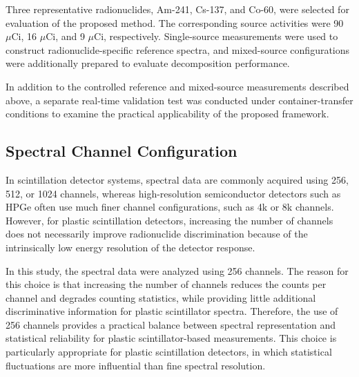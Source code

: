 \documentclass[fleqn, 10pt]{wlscirep}
\begin{document}


Three representative radionuclides, Am-241, Cs-137, and Co-60, were selected for evaluation of the proposed method. The corresponding source activities were 90 $\mu\text{Ci}$, 16 $\mu\text{Ci}$, and 9 $\mu\text{Ci}$, respectively. Single-source measurements were used to construct radionuclide-specific reference spectra, and mixed-source configurations were additionally prepared to evaluate decomposition performance.

In addition to the controlled reference and mixed-source measurements described above, a separate real-time validation test was conducted under container-transfer conditions to examine the practical applicability of the proposed framework.


\subsection*{Spectral Channel Configuration}

In scintillation detector systems, spectral data are commonly acquired using 256, 512, or 1024 channels, whereas high-resolution semiconductor detectors such as HPGe often use much finer channel configurations, such as 4k or 8k channels. However, for plastic scintillation detectors, increasing the number of channels does not necessarily improve radionuclide discrimination because of the intrinsically low energy resolution of the detector response.

In this study, the spectral data were analyzed using 256 channels. The reason for this choice is that increasing the number of channels reduces the counts per channel and degrades counting statistics, while providing little additional discriminative information for plastic scintillator spectra. Therefore, the use of 256 channels provides a practical balance between spectral representation and statistical reliability for plastic scintillator-based measurements. This choice is particularly appropriate for plastic scintillation detectors, in which statistical
fluctuations are more influential than fine spectral resolution.
\end{document}
